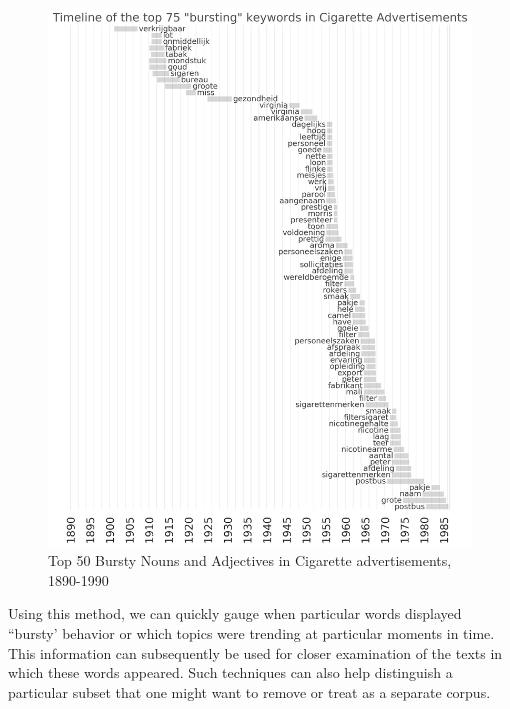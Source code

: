 \documentclass[USenglish]{article}
\begin{document}
\begin{figure}%
  \centering
  \includegraphics[width=.9\textwidth]{figures/bursts_top50}%
  \caption{Top 50 Bursty Nouns and Adjectives in Cigarette advertisements, 1890-1990}%
  \label{fig:burst_words}%
\end{figure}

Using this method, we can quickly gauge when particular words displayed ``bursty' behavior or which topics were trending at particular moments in time. This information can subsequently be used for closer examination of the texts in which these words appeared. Such techniques can also help distinguish a particular subset that one might want to remove or treat as a separate corpus. 
\end{document}
